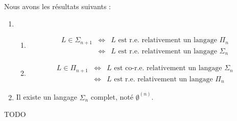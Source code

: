 \begin{theorem} [de post]
	Nous avons les résultats suivants :
	\begin{enumerate}
		\item
		      \begin{enumerate}
			      \item
			            \begin{eqnarray*}
				            L \in \Sigma_{n+1} &\iff& L \text{ est r.e. relativement  un langage }  \Pi_n  \\
				            &\iff& L \text{ est r.e. relativement  un langage }  \Sigma_{n}
			            \end{eqnarray*}

			      \item
			            \begin{eqnarray*}
				            L \in \Pi_{n+1} &\iff& L \text{ est co-r.e. relativement  un langage }  \Sigma_n  \\
				            &\iff& L \text{ est r.e. relativement  un langage }  \Pi_n
			            \end{eqnarray*}
		      \end{enumerate}

		\item Il existe un langage $\Sigma_n$ complet, noté $\emptyset^{(n)}$.
	\end{enumerate}
\end{theorem}

TODO

